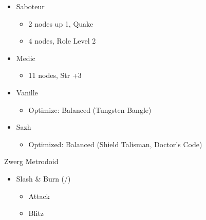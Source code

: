 \begin{multicols}{2}
\begin{menu}
\begin{itemize}
\begin{itemize}
\begin{itemize}
\begin{itemize}
                \item 2 nodes down 1, Fira
                \item \textit{If you have at least 2548 CP:}
                \item 2 nodes, Role Level 2
            \end{itemize}
            \item Saboteur
            \begin{itemize}
                \item 2 nodes up 1, Quake
                \item 4 nodes, Role Level 2
            \end{itemize}
            \item Medic
            \begin{itemize}
                \item 11 nodes, Str +3
            \end{itemize}
        \end{itemize}
    \end{itemize}
    \columnbreak
    \equip
    \begin{itemize}
        \item Vanille
        \begin{itemize}
            \item \begin{flushleft}Optimize: Balanced (Tungsten Bangle)\end{flushleft}
        \end{itemize}
        \item Sazh
        \begin{itemize}
            \item \begin{flushleft}Optimized: Balanced (Shield Talisman, Doctor's Code)\end{flushleft}
        \end{itemize}
    \end{itemize}
\end{itemize}
\end{menu}
\renewcommand{\first}{[1] Slash \& Burn (\com/\rav)}
\renewcommand{\second}{[2] War \& Peace (\com/\med)}
\renewcommand{\third}{[3] Tide Turner (\syn/\sab)}
\renewcommand{\fourth}{[4] }
\renewcommand{\fifth}{[5] Undermine (\rav/\sab)}
\renewcommand{\sixth}{[6] Divide \& Conquer (\com/\sab)}

\begin{battle}{Zwerg Metrodoid}
\begin{itemize}
    \item \first
    \begin{itemize}
        \item Attack
        \item Blitz
    \end{itemize}
\end{itemize}
\end{battle}


\end{multicols}
